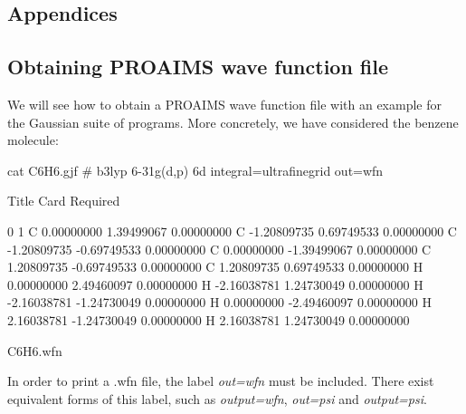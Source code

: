 \documentclass[a4paper,11pt,openany]{memoir}
\begin{document}

\printbibliography

\begin{appendices} 
\chapter{Appendices}
\section{Obtaining PROAIMS wave function file}\label{appx:getwfn}

We will see how to obtain a PROAIMS wave function file with an example for the Gaussian suite of programs. More concretely, we have considered the benzene molecule:
	\begin{consola}{cat C6H6.gjf}
# b3lyp 6-31g(d,p) 6d integral=ultrafinegrid
out=wfn

Title Card Required

0 1
C                  0.00000000    1.39499067    0.00000000
C                 -1.20809735    0.69749533    0.00000000
C                 -1.20809735   -0.69749533    0.00000000
C                  0.00000000   -1.39499067    0.00000000
C                  1.20809735   -0.69749533    0.00000000
C                  1.20809735    0.69749533    0.00000000
H                  0.00000000    2.49460097    0.00000000
H                 -2.16038781    1.24730049    0.00000000
H                 -2.16038781   -1.24730049    0.00000000
H                  0.00000000   -2.49460097    0.00000000
H                  2.16038781   -1.24730049    0.00000000
H                  2.16038781    1.24730049    0.00000000

C6H6.wfn
	\end{consola}

In order to print a .wfn file, the label \emph{out=wfn} must be included. There exist equivalent forms of this label, such as \emph{output=wfn}, \emph{out=psi} and \emph{output=psi}.


\end{appendices}
\end{document}
